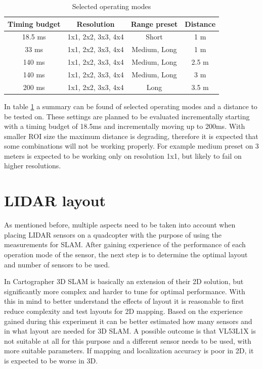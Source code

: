 \begin{table}[ht]
	\centering
	\begin{tabular}{||c c c c||}
		\hline
        Timing budget       & Resolution        & Range preset      & Distance  \\
		\hline\hline
        18.5 ms      & 1x1, 2x2, 3x3, 4x4      & Short      & 1 m \\
		\hline
        33 ms        & 1x1, 2x2, 3x3, 4x4      & Medium, Long       & 1 m \\
		\hline
        140 ms       & 1x1, 2x2, 3x3, 4x4      & Medium, Long       & 2.5 m \\
		\hline
        140 ms       & 1x1, 2x2, 3x3, 4x4      & Medium, Long       & 3 m \\
		\hline
        200 ms       & 1x1, 2x2, 3x3, 4x4      & Long       & 3.5 m \\
		\hline
	\end{tabular}
	\caption{Selected operating modes}
	\label{tab:selected_operating_modes}
\end{table}

In table \ref{tab:selected_operating_modes} a summary can be found of selected operating modes and a 
distance to be tested on. These settings are planned to be evaluated incrementally starting with a 
timing budget of 18.5ms and incrementally moving up to 200ms. With smaller ROI size the maximum 
distance is degrading, therefore it is expected that some combinations will not be working 
properly. For example medium preset on 3 meters is expected to be working only on resolution 1x1, 
but likely to fail on higher resolutions.








\section{LIDAR layout}
As mentioned before, multiple aspects need to be taken into account when placing LIDAR sensors on a
quadcopter with the purpose of using the measurements for SLAM. After gaining experience of the performance
of each operation mode of the sensor, the next step is to determine the optimal layout and number of sensors 
to be used. 

In Cartographer 3D SLAM is basically an extension of their 2D solution, but significantly more complex and 
harder to tune for optimal performance. With this in mind to better understand the effects of
layout it is reasonable to first reduce complexity and test layouts for 2D mapping. Based on 
the experience gained during this experiment it can be better estimated how many sensors and in what layout
are needed for 3D SLAM. A possible outcome is that VL53L1X is not suitable at all for this purpose and
a different sensor needs to be used, with more suitable parameters. If mapping and localization accuracy 
is poor in 2D, it is expected to be worse in 3D.

